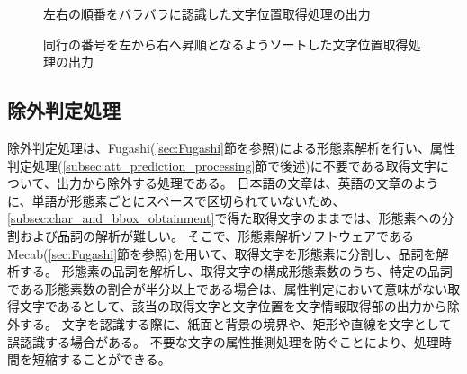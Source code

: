 \begin{figure}[t]
    \begin{center}
        \caption{左右の順番をバラバラに認識した文字位置取得処理の出力}
        \label{fig:before_sorted_string}
    \end{center}
\end{figure}

\begin{figure}[t]
    \begin{center}
        \caption{同行の番号を左から右へ昇順となるようソートした文字位置取得処理の出力}
        \label{fig:after_sorted_string}
    \end{center}
\end{figure}


\subsection{除外判定処理}\label{subsec:exclusion_judgement_processing}
除外判定処理は、Fugashi(\ref{sec:Fugashi}節を参照)による形態素解析を行い、属性判定処理(\ref{subsec:att_prediction_processing}節で後述)に不要である取得文字について、出力から除外する処理である。
日本語の文章は、英語の文章のように、単語が形態素ごとにスペースで区切られていないため、\ref{subsec:char_and_bbox_obtainment}で得た取得文字のままでは、形態素への分割および品詞の解析が難しい。
そこで、形態素解析ソフトウェアであるMecab(\ref{sec:Fugashi}節を参照)を用いて、取得文字を形態素に分割し、品詞を解析する。
形態素の品詞を解析し、取得文字の構成形態素数のうち、特定の品詞である形態素数の割合が半分以上である場合は、属性判定において意味がない取得文字であるとして、該当の取得文字と文字位置を文字情報取得部の出力から除外する。
文字を認識する際に、紙面と背景の境界や、矩形や直線を文字として誤認識する場合がある。
不要な文字の属性推測処理を防ぐことにより、処理時間を短縮することができる。

